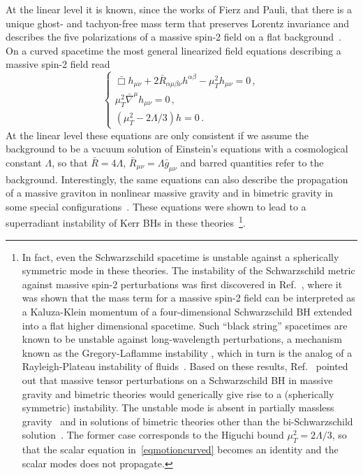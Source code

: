 \documentclass[11pt]{article}
\newcommand{\be}{\begin{equation}}
\newcommand{\ee}{\end{equation}}
\numberwithin{equation}{section} %
\begin{document}
At the linear level it is known, since the works of Fierz and Pauli, that there is a unique ghost- and tachyon-free mass term that preserves Lorentz invariance and describes the five polarizations of a massive spin-2 field on a flat background~\cite{Fierz:1939ix}.
%
On a curved spacetime the most general linearized field equations describing a massive spin-2 field read 
%
\be
\label{eqmotioncurved}
\left\{
\begin{array}{l}
\bar\Box h_{\mu\nu}+2 \bar R_{\alpha\mu\beta\nu} h^{\alpha\beta}-\mu_{T}^2 h_{\mu\nu}=0\,,\\
\mu_T^2\bar\nabla^{\mu}h_{\mu\nu}=0\,,\\
\left(\mu_{T}^2-{2\Lambda}/{3}\right)h=0\,.
\end{array}\right.
\ee
%
At the linear level these equations are only consistent if we assume the background to be a vacuum solution of Einstein's equations with a cosmological constant $\Lambda$, 
so that $\bar{R}=4\Lambda$, $\bar{R}_{\mu\nu}=\Lambda \bar{g}_{\mu\nu}$ and barred quantities refer to the background. Interestingly, the same equations can also describe the propagation of a massive graviton in nonlinear massive gravity and in bimetric gravity in some special configurations~\cite{Brito:2013wya}.
These equations were shown to lead to a superradiant instability of Kerr BHs in these theories~\cite{Brito:2013wya,Brito:2013yxa,Brito:2020lup}\footnote{
In fact, even the Schwarzschild spacetime is unstable against a spherically symmetric mode in these theories.
The instability of the Schwarzschild metric against massive spin-2 perturbations was first discovered in Ref.~\cite{Babichev:2013una}, where it was shown that the mass term for a massive spin-2 field can be interpreted as a Kaluza-Klein
momentum of a four-dimensional Schwarzschild BH extended into a flat higher dimensional spacetime.
Such ``black string'' spacetimes are known to be unstable against long-wavelength perturbations,
a mechanism known as the Gregory-Laflamme instability \cite{Gregory:1993vy,Kudoh:2006bp}, which in turn is the analog of a Rayleigh-Plateau instability of fluids~\cite{Cardoso:2006ks,Camps:2010br}. Based on these results, Ref.~\cite{Babichev:2013una} pointed out that massive tensor perturbations on a Schwarzschild BH in massive gravity and bimetric theories would generically give rise to a (spherically symmetric) instability. The unstable mode is absent in partially massless gravity~\cite{Brito:2013yxa} and in solutions of bimetric theories other than the bi-Schwarzschild solution~\cite{Babichev:2014oua}. The former case corresponds to the Higuchi bound $\mu_T^2=2\Lambda/3$, so that the scalar equation in~\eqref{eqmotioncurved} becomes an identity and the scalar modes does not propagate.}. 
\end{document}
